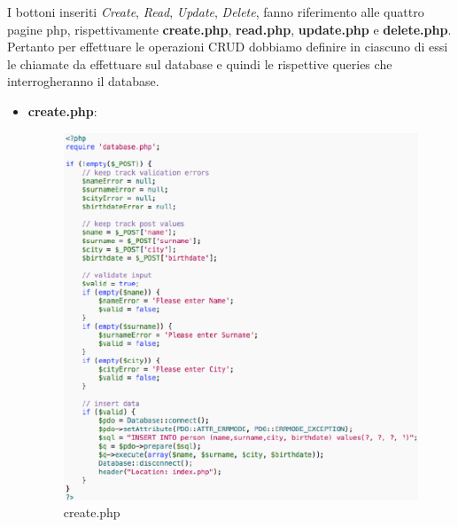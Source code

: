I bottoni inseriti \textit{Create}, \textit{Read}, \textit{Update}, \textit{Delete}, fanno riferimento alle quattro pagine php, rispettivamente \textbf{create.php}, \textbf{read.php}, \textbf{update.php} e \textbf{delete.php}. Pertanto per effettuare le operazioni CRUD dobbiamo definire in ciascuno di essi le chiamate da effettuare sul database e quindi le rispettive queries che interrogheranno il database. 


\begin{itemize}

\item{\textbf{create.php}}:

\begin{center}
\begin{figure}[H]
\centering
\includegraphics[scale=0.8]{figures/createphp.png}
\caption{create.php} 
\end{figure}
\end{center}


\end{itemize}
